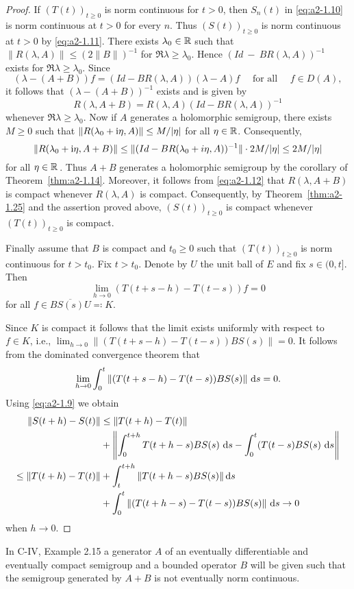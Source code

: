 \begin{proof}
If $(T(t))_{t \geq 0}$ is norm continuous for $t > 0$, then $S_{n}(t)$ in \eqref{eq:a2-1.10} is norm continuous at $t > 0$ for every $n$.
Thus $(S(t))_{t \geq 0}$ is norm continuous at $t > 0$ by \eqref{eq:a2-1.11}.
There exists $\lambda_{0} \in \mathbb{R}$ such that 
$\|R(\lambda,A)\| \leq (2\|B\|)^{-1}$ for $\Re\lambda \geq \lambda_{0}$.
Hence $(Id~-~BR(\lambda,A))^{-1}$ exists for $\Re\lambda \geq \lambda_{0}$.
Since 
\[
(\lambda -(A+B))f = (Id - BR(\lambda,A))(\lambda - A)f  \quad \text{ for all } \quad f \in D(A),
\]
it follows that $(\lambda-(A+B))^{-1}$ exists and is given by
\begin{equation}\label{eq:a2-1.12}
    R(\lambda,A+B) = R(\lambda,A)(Id-BR(\lambda,A))^{-1}
\end{equation}
whenever $\Re\lambda \geq \lambda_{0}$.
Now if $A$ generates a holomorphic semigroup, there exists $M \geq 0$ such that $\|R(\lambda_{0}+\mathrm{i}\eta,A)\| \leq M/|\eta|$ for all $\eta \in \mathbb{R}$.
Consequently, 
\[
\|R(\lambda_{0}+\mathrm{i}\eta,A+B)\| \leq \|(Id-BR(\lambda_{0}+i\eta,A))^{-1}\| \cdot 2M/|\eta| \leq 2M/|\eta|
\]
for all $\eta \in \mathbb{R}$\,.
Thus $A + B$ generates a holomorphic semigroup by the corollary of Theorem~\ref{thm:a2-1.14}.
Moreover, it follows from \eqref{eq:a2-1.12}  that $R(\lambda,A+B)$ is compact whenever $R(\lambda,A)$  is compact.
Consequently, by Theorem~\ref{thm:a2-1.25} and the  assertion proved above, $(S(t))_{t \geq 0}$ is compact whenever $(T(t))_{t \geq 0}$ is compact.

Finally assume that $B$ is compact and $t_{0} \geq 0$ such that $(T(t))_{t \geq 0}$ 
is norm continuous for $t > t_{0}$.
Fix $t > t_{0}$.
Denote by $U$ the unit ball of $E$ and fix $s \in (0,t]$.
Then
\[
    \lim_{h \to 0} (T(t+s-h) - T(t-s))f = 0
\]
for all $f \in \overline{BS(s)U} \eqqcolon K$.

Since $K$ is compact it follows that the limit exists uniformly with respect to $f \in K$, i.e., 
$\lim_{h \to 0} \|(T(t+s-h) - T(t-s))BS(s)\| = 0$.
It follows from the dominated convergence theorem that
\begin{equation}\label{eq:a2-1.13}
    \lim_{h \to 0} \int_{0}^{t} \|(T(t+s-h) - T(t-s))BS(s)\|\, \mathop{}\!\mathrm{d}{s} = 0.
\end{equation}
Using  \eqref{eq:a2-1.9}  we obtain 
\begin{align*}
	\|S(t+h) - S(t)\| &\leq \|T(t+h) - T(t)\|   \\
	&+  \left\| \int_{0}^{t+h} T(t+h-s)BS(s)\, \mathop{}\!\mathrm{d}{s} 
	-  \int_{0}^{t} (T(t-s)BS(s)\, \mathop{}\!\mathrm{d}{s} \right\|  \\
	\leq \|T(t+h) - T(t)\| &+ \int_{t}^{t+h} \|T(t+h-s)BS(s)\| \mathop{}\!\mathrm{d}{s}    \\ 
	&+ \int_{0}^{t} \|(T(t+h-s) - T(t-s))BS(s)\|\, \mathop{}\!\mathrm{d}{s} \to 0 
\end{align*}
when  $h \to 0$. 	
\end{proof}
In C-IV, Example 2.15 a generator $A$ of an eventually differentiable and eventually compact semigroup and a bounded operator $B$ will be given such that the semigroup generated by $A+B$ is not eventually norm continuous.

